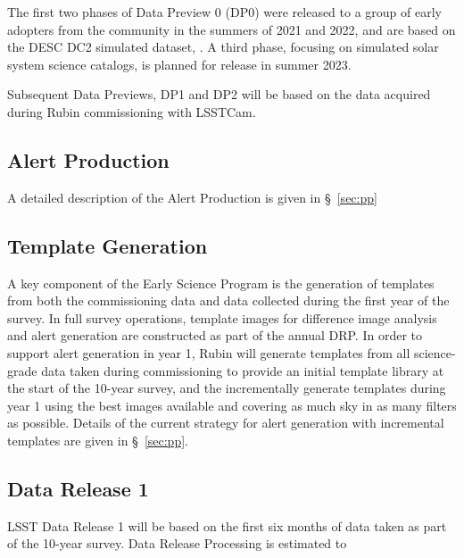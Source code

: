 The first two phases of Data Preview 0 (DP0) were released to a group of early adopters from the community in the summers of 2021 and 2022, and are based on the DESC DC2 simulated dataset, \citep{2021ApJS..253...31L}. A third phase, focusing on simulated solar system science catalogs, is planned for release in summer 2023.


Subsequent Data Previews, DP1 and DP2 will be based on the data acquired during Rubin commissioning with LSSTCam.

\subsection{Alert Production}

A detailed description of the Alert Production is given in \S~\ref{sec:pp}

\subsection {Template Generation}

A key component of the Early Science Program is the generation of templates from both the commissioning data and data collected during the first year of the survey.
In full survey operations, template images for difference image analysis and alert generation are constructed as part of the annual DRP.
In order to support alert generation in year 1, Rubin will generate templates from all science-grade data taken during commissioning to provide an initial template library at the start of the 10-year survey, and the incrementally generate templates during year 1 using the best images available and covering as much sky in as many filters as possible.
Details of the current strategy for alert generation  with incremental templates are given in  \S~\ref{sec:pp}.

\subsection{Data Release 1}

LSST Data Release 1 will be based on the first six months of data taken as part of the 10-year survey.
Data Release Processing is estimated to
